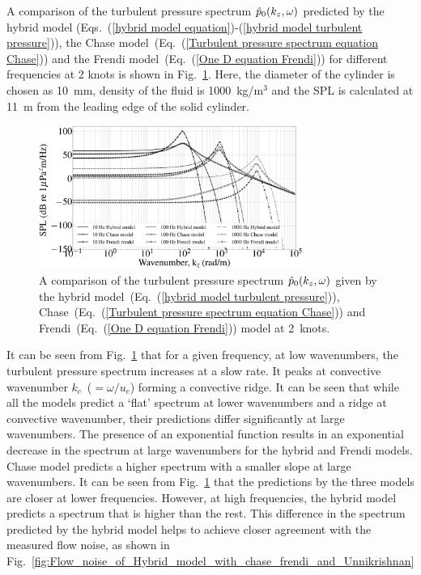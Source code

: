 \documentclass[11pt,cleanfoot]{asme2ej}
\begin{document}
A comparison of the turbulent pressure spectrum $\Hat{p}_0(k_z,\omega)$ predicted by the hybrid model (Eqs.~(\ref{hybrid model equation})-(\ref{hybrid model turbulent pressure})), the Chase model~(Eq.~(\ref{Turbulent pressure spectrum equation Chase})) and the Frendi model~(Eq.~(\ref{One D equation Frendi})) for different frequencies at 2 knots is shown in Fig.~\ref{pressure comparison of hybrid model with chase and Frendi}. Here, the diameter of the cylinder is chosen as 10~mm, density of the fluid is 1000~kg/m$^3$ and the SPL is calculated at 11~m from the leading edge of the solid cylinder. 
\begin{figure}
    \centering
    \includegraphics[width=3.4in]{Chase_hybrid_Frendi_outside_pressure_Spectrum.eps}
    \caption{A comparison of the turbulent pressure spectrum $\Hat{p}_0(k_z,\omega)$ given by the hybrid model~(Eq.~(\ref{hybrid model turbulent pressure})), Chase~(Eq.~(\ref{Turbulent pressure spectrum equation Chase})) and Frendi~(Eq.~(\ref{One D equation Frendi})) model at 2~knots.}
    \label{pressure comparison of hybrid model with chase and Frendi}
\end{figure}
It can be seen from Fig.~\ref{pressure comparison of hybrid model with chase and Frendi} that for a given frequency, at low wavenumbers, the turbulent pressure spectrum increases at a slow rate. It peaks at convective wavenumber $k_c$~($=\omega/u_c$) forming a convective ridge. It can be seen that while all the models predict a `flat' spectrum at lower wavenumbers and a ridge at convective wavenumber, their predictions differ significantly at large wavenumbers. The presence of an exponential function results in an exponential decrease in the spectrum at large wavenumbers for the hybrid and Frendi models. Chase model predicts a higher spectrum with a smaller slope at large wavenumbers. It can be seen from Fig.~\ref{pressure comparison of hybrid model with chase and Frendi} that the predictions by the three models are closer at lower frequencies. However, at high frequencies, the hybrid model predicts a spectrum that is higher than the rest. This difference in the spectrum predicted by the hybrid model helps to achieve closer agreement with the measured flow noise, as shown in Fig.~\ref{fig:Flow_noise_of_Hybrid_model_with_chase_frendi_and_Unnikrishnan}
\end{document}
